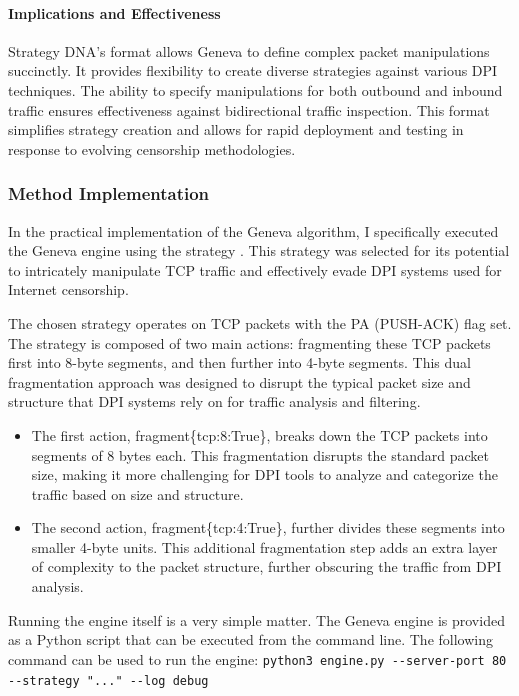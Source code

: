 \documentclass[12pt, fleqn, a4paper]{article}
\begin{document}
\paragraph{Implications and Effectiveness}
Strategy DNA's format allows Geneva to define complex packet manipulations succinctly. It provides flexibility to create diverse strategies against various DPI techniques. The ability to specify manipulations for both outbound and inbound traffic ensures effectiveness against bidirectional traffic inspection. This format simplifies strategy creation and allows for rapid deployment and testing in response to evolving censorship methodologies.


\subsubsection{Method Implementation}
In the practical implementation of the Geneva algorithm, I specifically executed the Geneva engine using the strategy . This strategy was selected for its potential to intricately manipulate TCP traffic and effectively evade DPI systems used for Internet censorship.

The chosen strategy operates on TCP packets with the PA (PUSH-ACK) flag set. The strategy is composed of two main actions: fragmenting these TCP packets first into 8-byte segments, and then further into 4-byte segments. This dual fragmentation approach was designed to disrupt the typical packet size and structure that DPI systems rely on for traffic analysis and filtering.

\begin{itemize}
\item The first action, fragment\{tcp:8:True\}, breaks down the TCP packets into segments of 8 bytes each. This fragmentation disrupts the standard packet size, making it more challenging for DPI tools to analyze and categorize the traffic based on size and structure.
\item The second action, fragment\{tcp:4:True\}, further divides these segments into smaller 4-byte units. This additional fragmentation step adds an extra layer of complexity to the packet structure, further obscuring the traffic from DPI analysis.
\end{itemize}
Running the engine itself is a very simple matter. The Geneva engine is provided as a Python script that can be executed from the command line. The following command can be used to run the engine: \verb|python3 engine.py --server-port 80 --strategy "..." --log debug |
\end{document}
